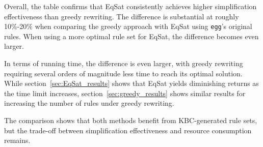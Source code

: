 \FloatBarrier
Overall, the table confirms that EqSat consistently achieves higher simplification effectiveness than greedy rewriting. The difference is substantial at roughly 10\%-20\% when comparing the greedy approach with EqSat using \texttt{egg}'s original rules. When using a more optimal rule set for EqSat, the difference becomes even larger. 

In terms of running time, the difference is even larger, with greedy rewriting requiring several orders of magnitude less time to reach its optimal solution. While section~\ref{sec:EqSat_results} shows that EqSat yields diminishing returns as the time limit increases, section~\ref{sec:greedy_results} shows similar results for increasing the number of rules under greedy rewriting.

The comparison shows that both methods benefit from KBC-generated rule sets, but the trade-off between simplification effectiveness and resource consumption remains.